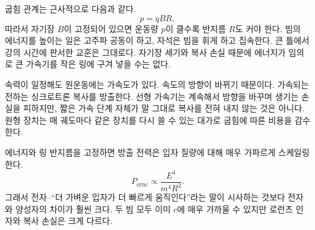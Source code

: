 \begin{classroomqa}
\end{classroomqa}

굽힘 관계는 근사적으로 다음과 같다.
\begin{equation}
p=qBR,
\end{equation}
따라서 자기장 \(B\)이 고정되어 있으면 운동량 \(p\)이 클수록 반지름 \(R\)도 커야 한다. 빔의 에너지를 높이는 일은 고주파 공동이 하고, 자석은 빔을 휘게 하고 집속한다. 큰 틀에서 강의 시간에 판서한 교훈은 그대로다. 자기장 세기와 복사 손실 때문에 에너지가 임의로 큰 가속기를 작은 링에 구겨 넣을 수는 없다.

속력이 일정해도 원운동에는 가속도가 있다. 속도의 방향이 바뀌기 때문이다. 가속되는 전하는 싱크로트론 복사를 방출한다. 선형 가속기는 계속해서 방향을 바꾸며 생기는 손실을 피하지만, 짧은 가속 단계 자체가 말 그대로 복사를 전혀 내지 않는 것은 아니다. 원형 장치는 매 궤도마다 같은 장치를 다시 쓸 수 있는 대가로 굽힘에 따른 비용을 감수한다.

\begin{classroomqa}
\end{classroomqa}

에너지와 링 반지름을 고정하면 방출 전력은 입자 질량에 대해 매우 가파르게 스케일링한다.
\begin{equation}
P_{\mathrm{sync}}\propto \frac{E^4}{m^4R^2}.
\end{equation}
그래서 전자--``더 가벼운 입자가 더 빠르게 움직인다''라는 말이 시사하는 것보다 전자와 양성자의 차이가 훨씬 크다. 두 빔 모두 이미 \(c\)에 매우 가까울 수 있지만 로런츠 인자와 복사 손실은 크게 다르다.


